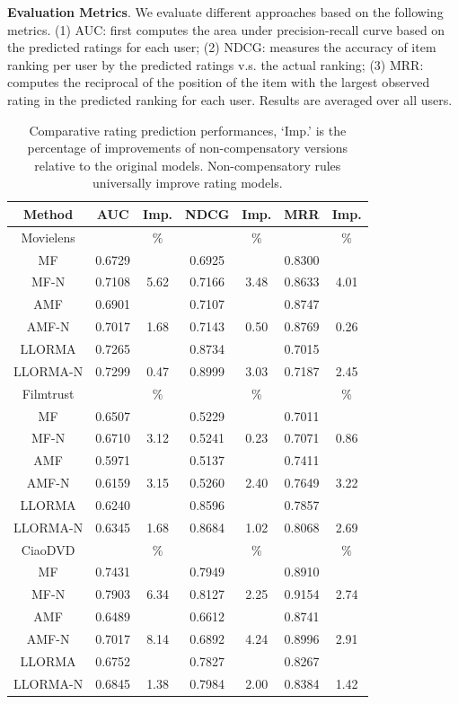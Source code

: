 \documentclass[letterpaper]{article} %
\begin{document}
\textbf{Evaluation Metrics}.  We evaluate different approaches based on the following metrics. (1) AUC: first computes the area under precision-recall curve based on the predicted ratings for each user; (2) NDCG: measures the accuracy of item ranking per user by the predicted ratings v.s. the actual ranking; (3)  MRR: computes the reciprocal of the position of the item with the largest observed rating in the predicted ranking for each user. Results are averaged over all users. 

\begin{table}[htp]
\caption{Comparative rating prediction performances, `Imp.' is the percentage of improvements of non-compensatory versions relative to the original models. Non-compensatory rules universally improve rating models.}
\scriptsize
\begin{center}
\begin{tabular}{c cc |cc |cc}
\hline
Method & AUC & Imp.& NDCG& Imp.& MRR &Imp.\\\hline
Movielens& & $\%$ & & $\%$ & & $\%$\\\hline
MF&	0.6729 &	&	0.6925 &	&	0.8300 &	\\
MF-N&	0.7108 &	5.62&	0.7166 &	3.48&	0.8633 &	4.01\\
AMF&	0.6901 &	&	0.7107 &	&	0.8747 &	\\
AMF-N&	0.7017 &	1.68&	0.7143 &	0.50&	0.8769 &	0.26\\
LLORMA&	0.7265 &	&	0.8734 &	&	0.7015 &	\\
LLORMA-N&	0.7299 &	0.47&	0.8999 &	3.03&	0.7187 &	2.45\\\hline
Filmtrust& & $\%$ & & $\%$ & & $\%$\\\hline
MF&	0.6507 &	&	0.5229 &	&	0.7011 &	\\
MF-N&	0.6710 &	3.12&	0.5241 &	0.23&	0.7071 &	0.86\\
AMF&	0.5971 &	&	0.5137 &	&	0.7411 &	\\
AMF-N&	0.6159 &	3.15&	0.5260 &	2.40&	0.7649 &	3.22\\
LLORMA&	0.6240 &	&	0.8596 &	&	0.7857 &	\\
LLORMA-N&	0.6345 &	1.68&	0.8684 &	1.02&	0.8068 &	2.69\\\hline
CiaoDVD& & $\%$ & & $\%$ & & $\%$\\\hline
MF&	0.7431 &	&	0.7949 &	&	0.8910 &	\\
MF-N&	0.7903 &	6.34&	0.8127 &	2.25&	0.9154 &	2.74\\
AMF&	0.6489 &	&	0.6612 &	&	0.8741 &	\\
AMF-N&	0.7017 &	8.14&	0.6892 &	4.24&	0.8996 &	2.91\\
LLORMA&	0.6752 &	&	0.7827 &	&	0.8267 &	\\
LLORMA-N&	0.6845 &	1.38&	0.7984 &	2.00&	0.8384 &	1.42\\
\hline
\end{tabular}
\end{center}
\label{tab:ratingresult}
\end{table}
\end{document}
